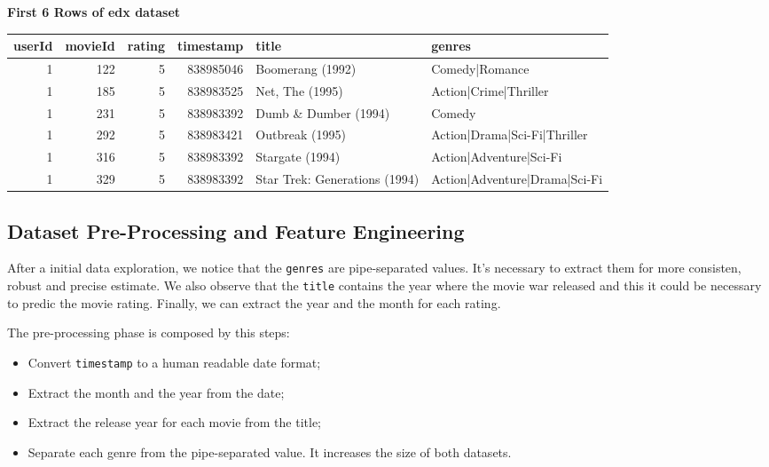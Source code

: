 \documentclass[]{article}
\providecommand{\tightlist}{%
  \setlength{\itemsep}{0pt}\setlength{\parskip}{0pt}}
\begin{document}
\newpage

\textbf{First 6 Rows of edx dataset}

\begin{table}[H]
\centering\begingroup\fontsize{10}{12}\selectfont

\begin{tabular}{r|r|r|r|l|l}
\hline
userId & movieId & rating & timestamp & title & genres\\
\hline
1 & 122 & 5 & 838985046 & Boomerang (1992) & Comedy|Romance\\
\hline
1 & 185 & 5 & 838983525 & Net, The (1995) & Action|Crime|Thriller\\
\hline
1 & 231 & 5 & 838983392 & Dumb \& Dumber (1994) & Comedy\\
\hline
1 & 292 & 5 & 838983421 & Outbreak (1995) & Action|Drama|Sci-Fi|Thriller\\
\hline
1 & 316 & 5 & 838983392 & Stargate (1994) & Action|Adventure|Sci-Fi\\
\hline
1 & 329 & 5 & 838983392 & Star Trek: Generations (1994) & Action|Adventure|Drama|Sci-Fi\\
\hline
\end{tabular}
\endgroup{}
\end{table}

\hypertarget{dataset-pre-processing-and-feature-engineering}{%
\subsection{Dataset Pre-Processing and Feature
Engineering}\label{dataset-pre-processing-and-feature-engineering}}

After a initial data exploration, we notice that the \texttt{genres} are
pipe-separated values. It's necessary to extract them for more
consisten, robust and precise estimate. We also observe that the
\texttt{title} contains the year where the movie war released and this
it could be necessary to predic the movie rating. Finally, we can
extract the year and the month for each rating.

The pre-processing phase is composed by this steps:

\begin{itemize}
\tightlist
\item
  Convert \texttt{timestamp} to a human readable date format;
\item
  Extract the month and the year from the date;
\item
  Extract the release year for each movie from the title;
\item
  Separate each genre from the pipe-separated value. It increases the
  size of both datasets.
\end{itemize}
\end{document}

